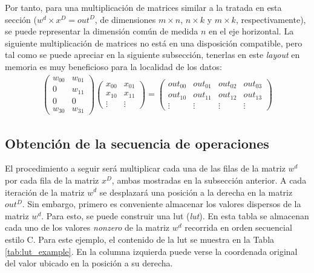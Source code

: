 Por tanto, para una multiplicación de matrices similar a la tratada en esta sección ($w^{d} \times x^{D} = out^{D}$, de dimensiones $m \times n$, $n \times k$ y $m \times k$, respectivamente), se puede representar la dimensión común de medida $n$ en el eje horizontal. La siguiente multiplicación de matrices no está en una disposición compatible, pero tal como se puede apreciar en la siguiente subsección, tenerlas en este \textit{layout} en memoria es muy beneficioso para la localidad de los datos: 
\begin{gather}
    \begin{pmatrix}
        w_{00} & w_{01}\\
        0 & w_{11}\\
        0 & 0\\
        w_{30} & w_{31}
    \end{pmatrix}	
    \begin{pmatrix}
        x_{00} & x_{01}\\
        x_{10} & x_{11}\\
        \vdots & \vdots
    \end{pmatrix}
    =
    \begin{pmatrix}
        out_{00} & out_{01} & out_{02} & out_{03}\\
        out_{10} & out_{11} & out_{12} & out_{13}\\
        \vdots & \vdots & \vdots & \vdots
    \end{pmatrix} \nonumber
\end{gather}

\subsection{Obtención de la secuencia de operaciones}
\label{ssec:obtencion_secuencia_operaciones}
El procedimiento a seguir será multiplicar cada una de las filas de la matriz $w^{d}$ por cada fila de la matriz $x^{D}$, ambas mostradas en la subsección anterior. A cada iteración de la matriz $w^{d}$ se desplazará una posición a la derecha en la matriz $out^{D}$. Sin embargo, primero es conveniente almacenar los valores dispersos de la matriz $w^{d}$. Para esto, se puede construir una \acrshort{lut} (\textit{\acrlong{lut}}). En esta tabla se almacenan cada uno de los valores \textit{nonzero} de la matriz $w^{d}$ recorrida en orden secuencial estilo C. Para este ejemplo, el contenido de la \acrshort{lut} se muestra en la Tabla \ref{tab:lut_example}. En la columna izquierda puede verse la coordenada original del valor ubicado en la posición a su derecha.


